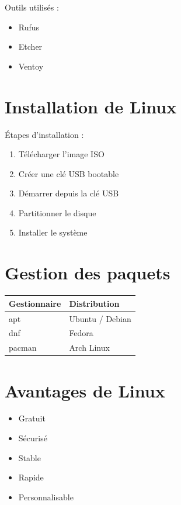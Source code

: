 \documentclass[12pt,a4paper]{report}
\begin{document}
Outils utilisés :

\begin{itemize}
    \item Rufus
    \item Etcher
    \item Ventoy
\end{itemize}

\section{Installation de Linux}

Étapes d’installation :

\begin{enumerate}
    \item Télécharger l’image ISO
    \item Créer une clé USB bootable
    \item Démarrer depuis la clé USB
    \item Partitionner le disque
    \item Installer le système
\end{enumerate}

\section{Gestion des paquets}

\begin{longtable}{|p{4cm}|p{5cm}|}
\hline
Gestionnaire & Distribution \\
\hline
apt & Ubuntu / Debian \\
\hline
dnf & Fedora \\
\hline
pacman & Arch Linux \\
\hline
\end{longtable}

\section{Avantages de Linux}

\begin{itemize}
    \item Gratuit
    \item Sécurisé
    \item Stable
    \item Rapide
    \item Personnalisable
\end{itemize}

\end{document}

